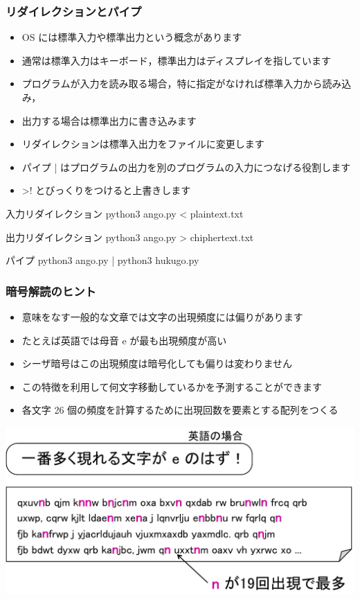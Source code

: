 \begin{frame}
\frametitle{リダイレクションとパイプ}
  \begin{itemize}
\item OS には標準入力や標準出力という概念があります
\item 通常は標準入力はキーボード，標準出力はディスプレイを指しています
\item プログラムが入力を読み取る場合，特に指定がなければ標準入力から読み込み，
\item 出力する場合は標準出力に書き込みます
\item リダイレクションは標準入出力をファイルに変更します
\item パイプ | はプログラムの出力を別のプログラムの入力につなげる役割します
\item >! とびっくりをつけると上書きします
  \end{itemize}
  \begin{itembox}{入力リダイレクション}
 python3 ango.py < plaintext.txt
  \end{itembox}
  \begin{itembox}{出力リダイレクション}
 python3 ango.py > chiphertext.txt
  \end{itembox}
  \begin{itembox}{パイプ}
 python3 ango.py | python3 hukugo.py
  \end{itembox}
\end{frame}
\begin{frame}
\frametitle{暗号解読のヒント}
  \begin{itemize}
\item 意味をなす一般的な文章では文字の出現頻度には偏りがあります
\item たとえば英語では母音 e が最も出現頻度が高い
\item シーザ暗号はこの出現頻度は暗号化しても偏りは変わりません
\item この特徴を利用して何文字移動しているかを予測することができます
\item 各文字 26 個の頻度を計算するために出現回数を要素とする配列をつくる
  \end{itemize}
  \begin{center}
\includegraphics[scale=0.3]{./Figure/elementaryCS-figHintForCryptoanalysis.pdf}
  \end{center}
\end{frame}
